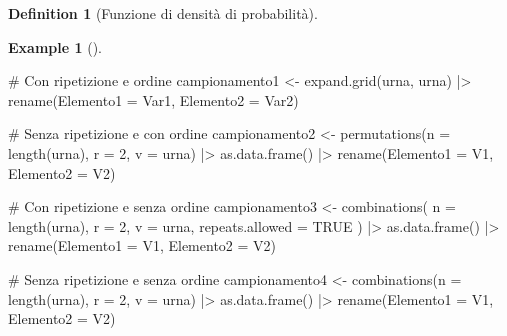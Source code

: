 \documentclass[
  letterpaper,
  DIV=11,
  numbers=noendperiod,
  oneside]{scrreprt}
\newenvironment{Shaded}{\begin{snugshade}}{\end{snugshade}}
\newcommand{\AttributeTok}[1]{\textcolor[rgb]{0.40,0.45,0.13}{#1}}
\newcommand{\CommentTok}[1]{\textcolor[rgb]{0.37,0.37,0.37}{#1}}
\newcommand{\ConstantTok}[1]{\textcolor[rgb]{0.56,0.35,0.01}{#1}}
\newcommand{\DecValTok}[1]{\textcolor[rgb]{0.68,0.00,0.00}{#1}}
\newcommand{\FunctionTok}[1]{\textcolor[rgb]{0.28,0.35,0.67}{#1}}
\newcommand{\NormalTok}[1]{\textcolor[rgb]{0.00,0.23,0.31}{#1}}
\newcommand{\OtherTok}[1]{\textcolor[rgb]{0.00,0.23,0.31}{#1}}
\newcommand{\SpecialCharTok}[1]{\textcolor[rgb]{0.37,0.37,0.37}{#1}}
\theoremstyle{definition}
\newtheorem{example}{Example}[chapter]
\theoremstyle{plain}
\theoremstyle{definition}
\newtheorem{definition}{Definition}[chapter]
\theoremstyle{remark}
\begin{document}
\begin{definition}[Funzione di densità di
probabilità]
\begin{example}[]
\begin{Shaded}
\begin{Highlighting}[]
\CommentTok{\# Con ripetizione e ordine}
\NormalTok{campionamento1 }\OtherTok{\textless{}{-}} \FunctionTok{expand.grid}\NormalTok{(urna, urna) }\SpecialCharTok{|\textgreater{}}
    \FunctionTok{rename}\NormalTok{(}\AttributeTok{Elemento1 =}\NormalTok{ Var1, }\AttributeTok{Elemento2 =}\NormalTok{ Var2)}

\CommentTok{\# Senza ripetizione e con ordine}
\NormalTok{campionamento2 }\OtherTok{\textless{}{-}} \FunctionTok{permutations}\NormalTok{(}\AttributeTok{n =} \FunctionTok{length}\NormalTok{(urna), }\AttributeTok{r =} \DecValTok{2}\NormalTok{, }\AttributeTok{v =}\NormalTok{ urna) }\SpecialCharTok{|\textgreater{}}
    \FunctionTok{as.data.frame}\NormalTok{() }\SpecialCharTok{|\textgreater{}}
    \FunctionTok{rename}\NormalTok{(}\AttributeTok{Elemento1 =}\NormalTok{ V1, }\AttributeTok{Elemento2 =}\NormalTok{ V2)}

\CommentTok{\# Con ripetizione e senza ordine}
\NormalTok{campionamento3 }\OtherTok{\textless{}{-}} \FunctionTok{combinations}\NormalTok{(}
    \AttributeTok{n =} \FunctionTok{length}\NormalTok{(urna), }\AttributeTok{r =} \DecValTok{2}\NormalTok{, }\AttributeTok{v =}\NormalTok{ urna, }\AttributeTok{repeats.allowed =} \ConstantTok{TRUE}
\NormalTok{) }\SpecialCharTok{|\textgreater{}}
    \FunctionTok{as.data.frame}\NormalTok{() }\SpecialCharTok{|\textgreater{}}
    \FunctionTok{rename}\NormalTok{(}\AttributeTok{Elemento1 =}\NormalTok{ V1, }\AttributeTok{Elemento2 =}\NormalTok{ V2)}

\CommentTok{\# Senza ripetizione e senza ordine}
\NormalTok{campionamento4 }\OtherTok{\textless{}{-}} \FunctionTok{combinations}\NormalTok{(}\AttributeTok{n =} \FunctionTok{length}\NormalTok{(urna), }\AttributeTok{r =} \DecValTok{2}\NormalTok{, }\AttributeTok{v =}\NormalTok{ urna) }\SpecialCharTok{|\textgreater{}}
    \FunctionTok{as.data.frame}\NormalTok{() }\SpecialCharTok{|\textgreater{}}
    \FunctionTok{rename}\NormalTok{(}\AttributeTok{Elemento1 =}\NormalTok{ V1, }\AttributeTok{Elemento2 =}\NormalTok{ V2)}


\end{Highlighting}
\end{Shaded}
\end{example}
\end{definition}
\end{document}
